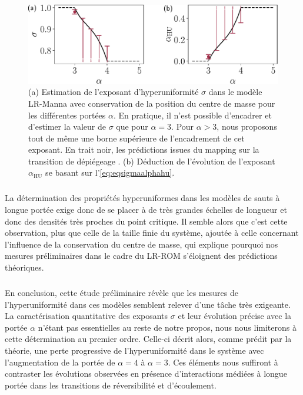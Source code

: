 \begin{figure}[h]
\centering
\includegraphics[width=\textwidth]{Chapitre2/Figures/Hyperuniformity/eta_alpha_jumpsManna.pdf}
\caption{(a) Estimation de l'exposant d'hyperuniformité $\sigma$ dans le modèle LR-Manna avec conservation de la position du centre de masse pour les différentes portées $\alpha$. En pratique, il n'est possible d'encadrer et d'estimer la valeur de $\sigma$ que pour $\alpha=3$. Pour $\alpha>3$, nous proposons tout de même une borne supérieure de l'encadrement de cet exposant. En trait noir, les prédictions issues du mapping sur la transition de dépiégeage \cite{wiese_longrange}. (b) Déduction de l'évolution de l'exposant $\alpha_\text{HU}$ se basant sur l'\autoref{eq:eqsigmaalphahu}. }
\label{eq:HUMannaShlag}
\end{figure}

\subparagraph{}La détermination des propriétés hyperuniformes dans les modèles de sauts à longue portée exige donc de se placer à de très grandes échelles de longueur et donc des densités très proches du point critique. Il semble alors que c'est cette observation, plus que celle de la taille finie du système, ajoutée à celle concernant l'influence de la conservation du centre de masse, qui explique pourquoi nos mesures préliminaires dans le cadre du LR-ROM s'éloignent des prédictions théoriques. 

\subparagraph{}En conclusion, cette étude préliminaire révèle que les mesures de l'hyperuniformité dans ces modèles semblent relever d'une tâche très exigeante. La caractérisation quantitative des exposants $\sigma$ et leur évolution précise avec la portée $\alpha$ n'étant pas essentielles au reste de notre propos, nous nous limiterons à cette détermination au premier ordre. Celle-ci décrit alors, comme prédit par la théorie, une perte progressive de l'hyperuniformité dans le système avec l'augmentation de la portée de $\alpha=4$ à $\alpha=3$. Ces éléments nous suffiront à contraster les évolutions observées en présence d'interactions médiées à longue portée dans les transitions de réversibilité et d'écoulement.

